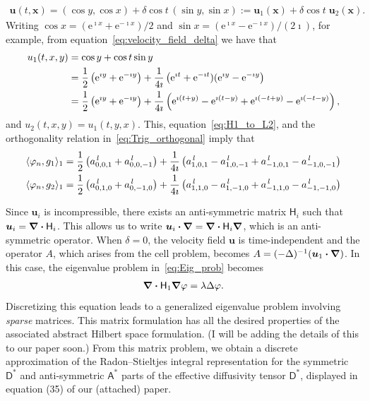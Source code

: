 \documentclass[leqno,onefignum,onetabnum]{siamltex1213}
\newcommand{\e}{\mathrm{e}}
\newcommand{\Dm}{\mathsf{D}}
\newcommand{\Hm}{\mathsf{H}}
\newcommand{\Am}{\mathsf{A}}
\newcommand\bnabla{\mbox{\boldmath${\nabla}$}}
\providecommand\bcdot{\boldsymbol{\cdot}}
\newcommand{\vecx}{\boldsymbol{x}}
\newcommand{\vecu}{\boldsymbol{u}}
\begin{document}
%
\begin{align}\label{eq:velocity_field_delta}
\vecu (t,\vecx)%
       =(\cos y,\cos x)+\delta\cos t \,(\sin y,\sin x)
       :=\vecu _1(\vecx)+\delta\cos{t}\;\vecu _2(\vecx). 
\end{align}
%
Writing
$\cos{x}=(\e^{\imath x}+\e^{-\imath x})/2$ and
$\sin{x}=(\e^{\imath x}-\e^{-\imath x})/(2\imath)$, for example, from equation~\eqref{eq:velocity_field_delta} we have that 
%
\begin{align}
  u_1(t,x,y)&=\cos{y}+\cos{t}\sin{y}\\ 
           &=\frac{1}{2}\left(\e^{\imath y}+\e^{-\imath y}\right)
            +\frac{1}{4\imath}\left(\e^{\imath t}+\e^{-\imath t})(\e^{\imath y}-\e^{-\imath y}\right)
            \notag\\
           &=\frac{1}{2}\left(\e^{\imath y}+\e^{-\imath y}\right)
            +\frac{1}{4\imath}\left(\e^{\imath(t+y)}-\e^{\imath(t-y)}+\e^{\imath(-t+y)}-\e^{\imath(-t-y)}\right),
            \notag
\end{align}
%
and $u_2(t,x,y)=u_1(t,y,x)$. This, equation~\eqref{eq:H1_to_L2}, and the
orthogonality relation in~\eqref{eq:Trig_orthogonal} imply that
%
\begin{align}\label{eq:Inner_Products_2D}
  \langle\varphi_n,g_1\rangle_1=\frac{1}{2}\left(a^{\,l}_{0,0,1}+a^{\,l}_{0,0,-1}\right)
               +\frac{1}{4\imath}\left(a^{\,l}_{1,0,1}-a^{\,l}_{1,0,-1}+a^{\,l}_{-1,0,1}-a^{\,l}_{-1,0,-1}\right) 
               \\
  \langle\varphi_n,g_2\rangle_1=\frac{1}{2}\left(a^{\,l}_{0,1,0}+a^{\,l}_{0,-1,0}\right)
               +\frac{1}{4\imath}\left(a^{\,l}_{1,1,0}-a^{\,l}_{1,-1,0}+a^{\,l}_{-1,1,0}-a^{\,l}_{-1,-1,0}\right)
               \notag
\end{align}
%




Since $\vecu _i$ is incompressible, there exists
an anti-symmetric matrix $\Hm_i$ such that
$\vecu _i=\bnabla \bcdot\Hm_i$. This allows us to write
$\vecu _i\bcdot\bnabla =\bnabla \bcdot\Hm_i\bnabla $, which is an anti-symmetric
operator. When $\delta=0$, the velocity field $\vecu $ is time-independent
and the operator $A$, which arises from the cell problem, becomes
$A=(-\Delta)^{-1}(\vecu _1\bcdot\bnabla )$. In this case, the eigenvalue
problem in~\eqref{eq:Eig_prob} becomes  
%
\begin{align}\label{eq:Eig_prob_steady}
  \bnabla \bcdot\Hm_1\bnabla \varphi=\lambda\Delta\varphi.
\end{align}
%
Discretizing this equation leads to a generalized eigenvalue
problem involving \emph{sparse} matrices. This matrix formulation has
all the desired properties of the associated abstract Hilbert space
formulation. (I will be adding the details of this to our paper soon.)
From this matrix problem, we obtain a discrete approximation of the
Radon--Stieltjes integral representation for the symmetric $\Dm^*$
and anti-symmetric $\Am^*$ parts of the effective diffusivity
tensor $\Dm^*$, displayed in equation (35) of our (attached) paper.  
\end{document}
